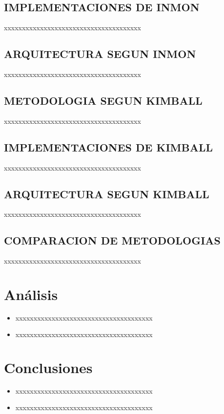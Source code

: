 \documentclass[%
 reprint,
 amsmath,amssymb,
 aps,
]{revtex4-1}
\begin{document}
\subsection{IMPLEMENTACIONES DE  INMON}
xxxxxxxxxxxxxxxxxxxxxxxxxxxxxxxxxxxxxx 

\subsection{ARQUITECTURA SEGUN INMON}
xxxxxxxxxxxxxxxxxxxxxxxxxxxxxxxxxxxxxx 

\subsection{METODOLOGIA SEGUN KIMBALL}	
xxxxxxxxxxxxxxxxxxxxxxxxxxxxxxxxxxxxxx 

\subsection{IMPLEMENTACIONES DE KIMBALL}
xxxxxxxxxxxxxxxxxxxxxxxxxxxxxxxxxxxxxx 

\subsection{ARQUITECTURA SEGUN KIMBALL}

xxxxxxxxxxxxxxxxxxxxxxxxxxxxxxxxxxxxxx 


\subsection{COMPARACION DE METODOLOGIAS}	
xxxxxxxxxxxxxxxxxxxxxxxxxxxxxxxxxxxxxx \cite{kumar}\\

\section{Análisis}

\begin{itemize}
\item xxxxxxxxxxxxxxxxxxxxxxxxxxxxxxxxxxxxxx 
\item xxxxxxxxxxxxxxxxxxxxxxxxxxxxxxxxxxxxxx 
\end{itemize}
\section{Conclusiones}

\begin{itemize}
\item xxxxxxxxxxxxxxxxxxxxxxxxxxxxxxxxxxxxxx 
\item xxxxxxxxxxxxxxxxxxxxxxxxxxxxxxxxxxxxxx 

\end{itemize}






\end{document}
